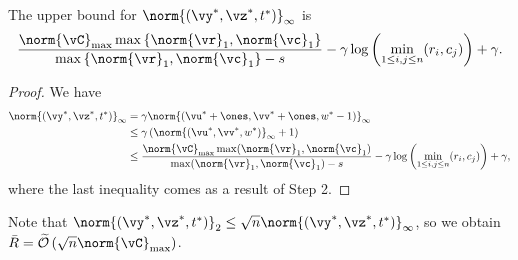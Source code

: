 \begin{corollary} \label{Bounds_for_(u,v)}
    The upper bound for $\norm{(\vy^\ast,\vz^\ast,t^\ast)}_\infty$ is
    \begin{equation} \label{infty_bounds}
        \frac{\norm{\vC}_{\max} \max\left\{\norm{\vr}_1, \norm{\vc}_1\right\}}{\max\left\{\norm{\vr}_1, \norm{\vc}_1\right\}-s} - \gamma \log{ \left( \min_{1 \leq i,j \leq n} (r_i, c_j) \right)} + \gamma.
    \end{equation}
\end{corollary}
\begin{proof}
    We have
    \begin{align*} 
        \norm{(\vy^\ast,\vz^\ast,t^\ast)}_\infty &=  \gamma \norm{(\vu^\ast + \ones,\vv^\ast + \ones, w^\ast - 1)}_\infty \\
        &\leq \gamma \left( \norm{(\vu^\ast,\vv^\ast, w^\ast)}_\infty + 1 \right) \\
        &\leq \frac{ \norm{\vC}_{\max} \max(\norm{\vr}_1, \norm{\vc}_1)}{ \max(\norm{\vr}_1, \norm{\vc}_1)-s} -\gamma \log{ \left( \min_{1 \leq i,j \leq n} (r_i, c_j) \right)} + \gamma, 
    \end{align*}
    where the last inequality comes as a result of Step 2.
\end{proof}
Note that $\norm{(\vy^\ast,\vz^\ast,t^\ast)}_2 \leq \sqrt{n} \norm{(\vy^\ast,\vz^\ast,t^\ast)}_\infty$, so we obtain $\Bar{R} = \mathcal{\widetilde{O}}\left(\sqrt{n} \norm{\vC}_{\max} \right)$.

